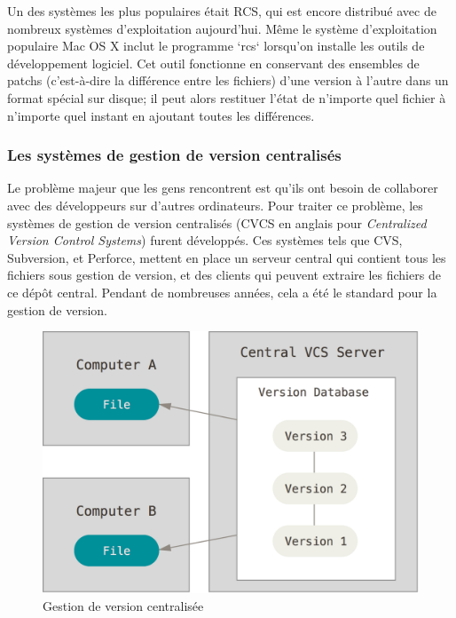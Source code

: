 Un des systèmes les plus populaires était RCS, qui est encore distribué avec de nombreux systèmes d'exploitation aujourd'hui.
Même le système d'exploitation populaire Mac OS X inclut le programme `rcs` lorsqu'on installe les outils de développement logiciel.
Cet outil fonctionne en conservant des ensembles de patchs (c'est-à-dire la différence entre les fichiers) d'une version à l'autre dans un format spécial sur disque;
il peut alors restituer l'état de n'importe quel fichier à n'importe quel instant en ajoutant toutes les différences.

\subsubsection{Les systèmes de gestion de version centralisés}


Le problème majeur que les gens rencontrent est qu'ils ont besoin de collaborer avec des développeurs sur d'autres ordinateurs.
Pour traiter ce problème, les systèmes de gestion de version centralisés (CVCS en anglais pour \emph{Centralized Version Control Systems}) furent développés.
Ces systèmes tels que CVS, Subversion, et Perforce, mettent en place un serveur central qui contient tous les fichiers sous gestion de version, et des clients qui peuvent extraire les fichiers de ce dépôt central.
Pendant de nombreuses années, cela a été le standard pour la gestion de version.

\begin{figure}[H]
  \centering
  \includegraphics{images/centralized}
  \caption{Gestion de version centralisée}
  \label{fig:git:centralized}
\end{figure}


